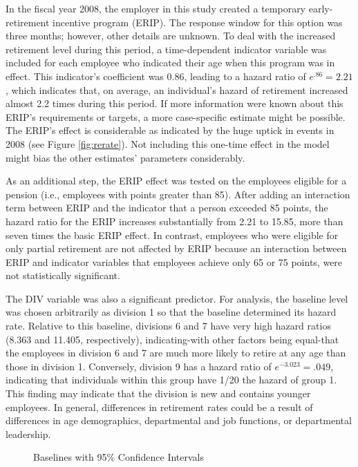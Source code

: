 In the fiscal year 2008, the employer in this study created a temporary early-retirement incentive program (ERIP). The response window for this option was three months; however, other details are unknown. To deal with the increased retirement level during this period, a time-dependent indicator variable was included for each employee who indicated their age when this program was in effect. This indicator's coefficient was 0.86, leading to a hazard ratio of $e^{.86} = 2.21$, which indicates that, on average, an individual's hazard of retirement increased almost 2.2 times during this period. If more information were known about this ERIP's requirements or targets, a more case-specific estimate might be possible. The ERIP's effect is considerable as indicated by the huge uptick in events in 2008 (see Figure \ref{fig:rerate}). Not including this one-time effect in the model might bias the other estimates' parameters considerably.

As an additional step, the ERIP effect was tested on the employees eligible for a pension (i.e., employees with points greater than 85). After adding an interaction term between ERIP and the indicator that a person exceeded 85 points, the hazard ratio for the ERIP increases substantially from 2.21 to 15.85, more than seven times the basic ERIP effect. In contrast, employees who were eligible for only partial retirement are not affected by ERIP because an interaction between ERIP and indicator variables that employees achieve only 65 or 75 points, were not statistically significant.

The DIV variable was also a significant predictor. For analysis, the baseline level was chosen arbitrarily as division 1 so that the baseline determined its hazard rate. Relative to this baseline, divisions 6 and 7 have very high hazard ratios (8.363 and 11.405, respectively), indicating-with other factors being equal-that the employees in division 6 and 7 are much more likely to retire at any age than those in division 1. Conversely, division 9 has a hazard ratio of $e^{-3.023} = .049$, indicating that individuals within this group have 1/20 the hazard of group 1.  This finding may indicate that the division is new and contains younger employees.  In general, differences in retirement rates could be a result of differences in age demographics, departmental and job functions, or departmental leadership.
\begin{figure}[h!]
	\centering
	\caption{Baselines with 95\% Confidence Intervals}
	\label{fig:basepred}
\end{figure}

